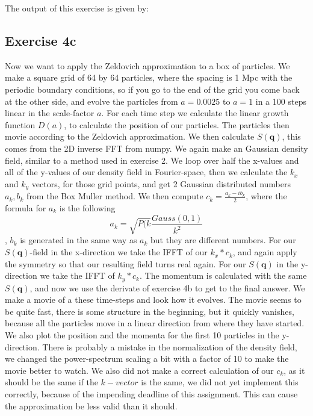 The output of this exercise is given by:



\subsection{Exercise 4c}
Now we want to apply the Zeldovich approximation to a box of particles. We make a square grid of 64 by 64 particles, where the spacing is 1 Mpc with the periodic boundary conditions, so if you go to the end of the grid you come back at the other side, and evolve the particles from $a=0.0025$ to $a=1$ in a 100 steps linear in the scale-factor $a$. For each time step we calculate the linear growth function $D(a)$, to calculate the position of our particles. The particles then movie according to the Zeldovich approximation. We then calculate $S(\textbf{q})$, this comes from the 2D inverse FFT from numpy. We again make an Gaussian density field, similar to a method used in exercise 2. We loop over half the x-values and all of the y-values of our density field in Fourier-space, then we calculate the $k_x$ and $k_y$ vectors, for those grid points, and get 2 Gaussian distributed numbers $a_k,b_k$ from the Box Muller method. We then compute $c_k=\frac{a_k-ib_k}{2}$, where the formula for $a_k$ is the following
\begin{equation}
    a_k=\sqrt{P(k}\frac{Gauss(0,1)}{k^2}
\end{equation}
, $b_k$ is generated in the same way as $a_k$ but they are different numbers. For our $S(\textbf{q})$-field in the x-direction we take the IFFT of our $k_x*c_k$, and again apply the symmetry so that our resulting field turns real again. For our $S(\textbf{q})$ in the y-direction we take the IFFT of $k_y*c_k$. The momentum is calculated with the same $S(\textbf{q})$, and now we use the derivate of exercise 4b to get to the final answer.
We make a movie of a these time-steps and look how it evolves. The movie seems to be quite fast, there is some structure in the beginning, but it quickly vanishes, because all the particles move in a linear direction from where they have started. We also plot the position and the momenta for the first 10 particles in the y-direction. There is probably a mistake in the normalization of the density field, we changed the power-spectrum scaling a bit with a factor of 10 to make the movie better to watch. We also did not make a correct calculation of our $c_k$, as it should be the same if the $k-vector$ is the same, we did not yet implement this correctly, because of the impending deadline of this assignment. This can cause the approximation be less valid than it should.

